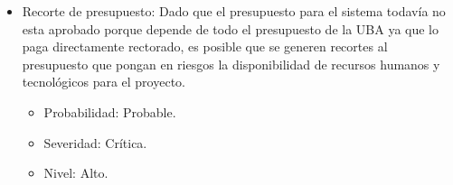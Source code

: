 \begin{itemize}
\bigskip

\item Recorte de presupuesto: Dado que el presupuesto para el sistema todav\'ia no esta aprobado porque depende de todo el presupuesto de la UBA ya que lo paga directamente rectorado, es posible que se generen recortes al presupuesto que pongan en riesgos la disponibilidad de recursos humanos y tecnol\'ogicos para el proyecto.
\begin{itemize}
\item Probabilidad: Probable.
\item Severidad: Cr\'itica.
\item Nivel: Alto.
\end{itemize}

\end{itemize}